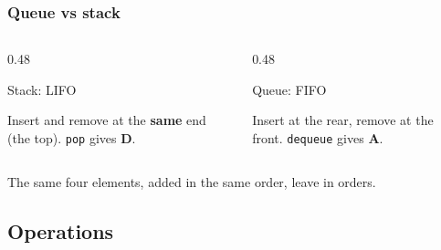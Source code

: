 \documentclass[aspectratio=169,10pt,compress]{beamer}
\begin{document}
\begin{frame}[t,fragile] \frametitle{Queue vs stack}
  \begin{columns}[T]
    \begin{column}{0.48\textwidth}
      \begin{block}{Stack: LIFO}
        \begin{center}
        \end{center}
        \small Insert and remove at the \textbf{same} end (the top). \texttt{pop} gives \textbf{D}.
      \end{block}
    \end{column}
    \begin{column}{0.48\textwidth}
      \begin{block}{Queue: FIFO}
        \begin{center}
        \end{center}
        \small Insert at the rear, remove at the front. \texttt{dequeue} gives \textbf{A}.
      \end{block}
    \end{column}
  \end{columns}
  \vspace{0.6em}
  \small The same four elements, added in the same order, leave in  orders.
\end{frame}


\subsection[Operations]{Operations}
\end{document}

